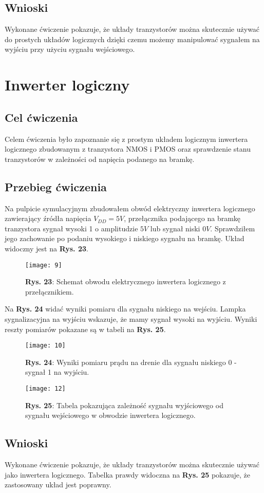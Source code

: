 \documentclass[11pt]{article}
\begin{document}
\subsection{Wnioski}
Wykonane ćwiczenie pokazuje, że układy tranzystorów można skutecznie używać do prostych układów logicznych dzięki czemu możemy manipulować sygnałem na wyjściu przy użyciu sygnału wejściowego.
\section{Inwerter logiczny}
\subsection{Cel ćwiczenia}
Celem ćwiczenia było zapoznanie się z prostym układem logicznym inwertera logicznego zbudowanym z tranzystora NMOS i PMOS oraz sprawdzenie stanu tranzystorów w zależności od napięcia podanego na bramkę.
\subsection{Przebieg ćwiczenia}
Na pulpicie symulacyjnym zbudowałem obwód elektryczny inwertera logicznego zawierający źródła napięcia $V_{DD}=5V$, przełącznika podającego na bramkę tranzystora sygnał wysoki 1 o amplitudzie $5V$ lub sygnał niski $0V$. Sprawdziłem jego zachowanie
po podaniu wysokiego i niskiego sygnału na bramkę. Układ widoczny jest na \textbf{Rys. 23}.
\begin{figure}[H]
\centering
\texttt{[image: 9]}
\caption*{\textbf{Rys. 23}: Schemat obwodu elektrycznego inwertera logicznego z przełącznikiem. }
\end{figure}
\noindent Na \textbf{Rys. 24} widać wyniki pomiaru dla sygnału niskiego na wejściu. Lampka sygnalizacyjna na wyjściu wskazuje, że mamy sygnał wysoki na wyjściu. Wyniki reszty pomiarów pokazane są w tabeli na \textbf{Rys. 25}.
\begin{figure}[H]
\centering
\texttt{[image: 10]}
\caption*{\textbf{Rys. 24}: Wyniki pomiaru prądu na drenie dla sygnału niskiego 0 - sygnał 1 na wyjściu. }
\end{figure}
\begin{figure}[H]
\centering
\texttt{[image: 12]}
\caption*{\textbf{Rys. 25}: Tabela pokazująca zależność sygnału wyjściowego od sygnału wejściowego w obwodzie inwertera logicznego.}
\end{figure}
\subsection{Wnioski}
Wykonane ćwiczenie pokazuje, że układy tranzystorów można skutecznie używać jako inwertera logicznego. Tabelka prawdy widoczna na \textbf{Rys. 25} pokazuje, że zastosowany układ jest poprawny.
\end{document}

